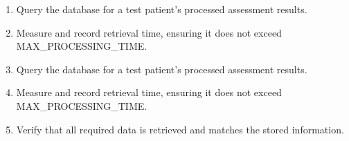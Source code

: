 \documentclass[12pt, titlepage]{article}
\begin{document}
\begin{itemize}
\begin{mdframed}[linewidth=0.5mm]
\begin{enumerate}[noitemsep]
        \item Query the database for a test patient’s processed assessment results.
        \item Measure and record retrieval time, ensuring it does not exceed \\ MAX\_PROCESSING\_TIME.
        \item Query the database for a test patient’s processed assessment results.
        \item Measure and record retrieval time, ensuring it does not exceed \\ MAX\_PROCESSING\_TIME.
        \item Verify that all required data is retrieved and matches the stored information.
      \end{enumerate}
  \end{mdframed}


\end{itemize}
\end{document}
